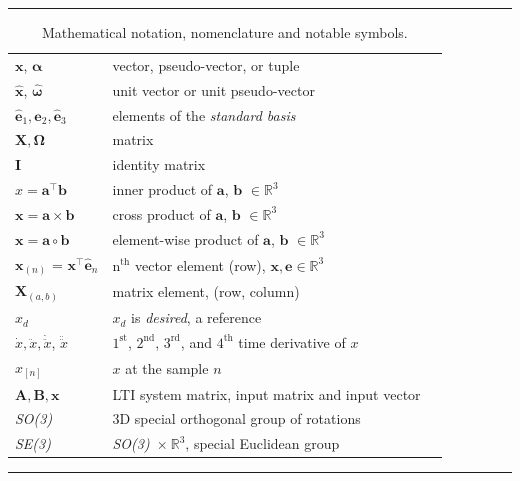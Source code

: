 \begin{table}[!h]
  \scriptsize
  \centering
  \noindent\rule{\textwidth}{0.5pt}
  \begin{tabular}{lll}
    $\mathbf{x}$, $\bm{\alpha}$ & vector, pseudo-vector, or tuple\\
    $\mathbf{\hat{x}}$, $\bm{\hat{\omega}}$& unit vector or unit pseudo-vector\\
    $\mathbf{\hat{e}}_1, \mathbf{\hat{e}}_2, \mathbf{\hat{e}}_3$ & elements of the \emph{standard basis} \\
    $\mathbf{X}, \bm{\Omega}$ & matrix \\
    $\mathbf{I}$ & identity matrix \\
    $x = \mathbf{a}^\intercal\mathbf{b}$ & inner product of $\mathbf{a}$, $\mathbf{b}$ $\in \mathbb{R}^3$\\
    $\mathbf{x} = \mathbf{a}\times\mathbf{b}$ & cross product of $\mathbf{a}$, $\mathbf{b}$ $\in \mathbb{R}^3$\\
    $\mathbf{x} = \mathbf{a}\circ\mathbf{b}$ & element-wise product of $\mathbf{a}$, $\mathbf{b}$ $\in \mathbb{R}^3$ \\
    $\mathbf{x}_{(n)}$ = $\mathbf{x}^\intercal\mathbf{\hat{e}}_n$ & $\mathrm{n}^{\mathrm{th}}$ vector element (row), $\mathbf{x}, \mathbf{e} \in \mathbb{R}^3$\\
    $\mathbf{X}_{(a,b)}$ & matrix element, (row, column)\\
    $x_{d}$ & $x_d$ is \emph{desired}, a reference\\
    $\dot{x}, \ddot{x}, \dot{\ddot{x}}$, $\ddot{\ddot{x}}$ & ${1^{\mathrm{st}}}$, ${2^{\mathrm{nd}}}$, ${3^{\mathrm{rd}}}$, and ${4^{\mathrm{th}}}$ time derivative of $x$\\
    $x_{[n]}$ & $x$ at the sample $n$ \\
    $\mathbf{A}, \mathbf{B}, \mathbf{x}$ & LTI system matrix, input matrix and input vector\\
    \emph{SO(3)} & 3D special orthogonal group of rotations\\
    \emph{SE(3)} & \emph{SO(3)}~$\times~\mathbb{R}^3$, special Euclidean group\\
  \end{tabular}
  \noindent\rule{\textwidth}{0.5pt}
  \caption{Mathematical notation, nomenclature and notable symbols.}
  \label{tab:mathematical_notation}
\end{table}
